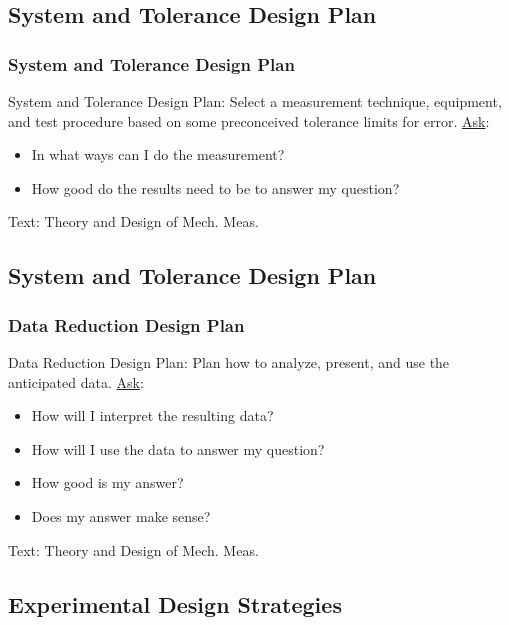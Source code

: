 \documentclass[fleqn]{beamer} %
\newcommand{\sectionIIIsubsectionIItitle}{System and Tolerance Design Plan}
\newcommand{\sectionIIIsubsectionIIItitle}{Data Reduction Design Plan}
\newcommand{\sectionIIIsubsectionIVtitle}{Experimental Design Strategies}
\begin{document}
		\subsection{\sectionIIIsubsectionIItitle}\label{sectionIIIsubsectionII}	

			\begin{frame}
				\frametitle{\sectionIIIsubsectionIItitle}

				{\PR System and Tolerance Design Plan}: Select a measurement technique, equipment, and
				test procedure based on some preconceived tolerance limits for error. \vspc
				\underline{Ask}:
				\begin{itemize}
				\item In what ways can I do the measurement?
				\item How good do the results need to be to answer my
				question? 
				\end{itemize} 

				{\tiny Text: Theory and Design of Mech. Meas.}
			\end{frame}

		\subsection{\sectionIIIsubsectionIItitle}\label{sectionIIIsubsectionIII}

			\begin{frame}
				\frametitle{\sectionIIIsubsectionIIItitle}

				{\GR Data Reduction Design Plan}: Plan how to analyze, present, and use the anticipated data.\vspc
				\underline{Ask}:
				\begin{itemize}
				\item How will I interpret the resulting data?
				\item How will I use the data to answer my question?
				\item How good is my answer? 
				\item Does my answer make sense?
				\end{itemize} 

				{\tiny Text: Theory and Design of Mech. Meas.}
			\end{frame}

		\subsection{\sectionIIIsubsectionIVtitle}\label{sectionIIIsubsectionIV}	
\end{document}
